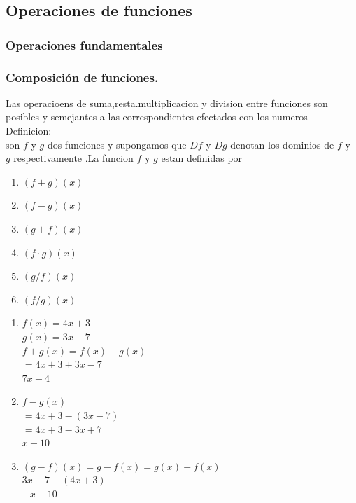 \documentclass[english,10pt,a4paper]{article}
\begin{document}
{{}
\newpage
\subsection{Operaciones de funciones }
\subsubsection{Operaciones fundamentales}
\subsubsection{Composición de funciones.}
Las operacioens de suma,resta.multiplicacion y division entre funciones son posibles y semejantes a las correspondientes efectados con los numeros\\
Definicion:\\
son $f$ y $g$ dos funciones y supongamos que $Df$ y $Dg$ denotan los dominios de $f$ y $g$ respectivamente .La funcion  $f$ y $g$ estan definidas por \\
\begin{enumerate}
	\item $(f+g)(x)$
		\item $(f-g)(x)$
			\item $(g+f)(x)$
				\item $(f\cdot g)(x)$
							\item $(g/ f)(x)$
								\item $(f/g)(x)$
							
							
	

\end{enumerate} 
\begin{enumerate}
\item {\center $f(x)=4x+3$\\
	$g(x)=3x-7$\\
	$f+g(x)=f(x)+g(x)$\\
	$=4x+3+3x-7$\\
	$7x-4$\\
	
	
}		
\item{ \center$f-g(x)$\\
	$=4x+3-(3x-7)$\\
	$=4x+3-3x+7$\\
	$x+10$\\
	
	}	
	\item { \center$(g-f)(x)=g-f(x)=g(x)-f(x)$\\
		$3x-7-(4x+3)$\\
		$-x-10$\\
		
}
\end{enumerate}}
\end{document}
